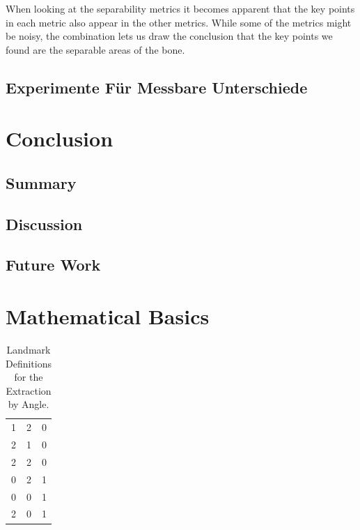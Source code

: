 \documentclass[pdftex,12pt,a4paper]{report}
\begin{document}
When looking at the separability metrics it becomes apparent that the key points in each metric also appear in the other metrics. While some of the metrics might be noisy, the combination lets us draw the conclusion that the key points we found are the separable areas of the bone.

\section{Experimente Für Messbare Unterschiede}

\chapter{Conclusion}

\section{Summary}

\section{Discussion}

\section{Future Work}

\appendix

\chapter{Mathematical Basics}

\begin{table}[h]
	\begin{center}
		\begin{tabular}{|r|r|r|}
			\hline
			\makebox[1cm]{$f_1$} & \makebox[1cm]{$f_2$} & \makebox[1cm]{$c$} \\
			\hline
			\hline 1 & 2 & 0 \\
			\hline 2 & 1 & 0 \\
			\hline 2 & 2 & 0 \\
			\hline 0 & 2 & 1 \\
			\hline 0 & 0 & 1 \\
			\hline 2 & 0 & 1 \\
			\hline
		\end{tabular}
	\end{center}
	\caption{Landmark Definitions for the Extraction by Angle.}
	\label{appendix:table:decision-tree}
\end{table}
\end{document}
